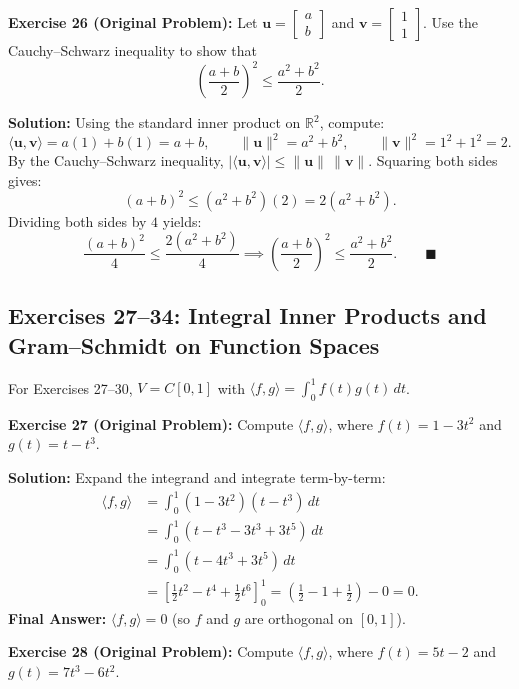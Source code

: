 \documentclass[11pt, letterpaper]{article}
\theoremstyle{definition}
\theoremstyle{remark}
\begin{document}
\textbf{Exercise 26 (Original Problem):} Let $\mathbf{u} = \begin{bmatrix} a \\ b \end{bmatrix}$ and $\mathbf{v} = \begin{bmatrix} 1 \\ 1 \end{bmatrix}$. Use the Cauchy--Schwarz inequality to show that
\[
    \left(\frac{a+b}{2}\right)^2 \le \frac{a^2 + b^2}{2}.
\]

\textbf{Solution:}
Using the standard inner product on $\mathbb{R}^2$, compute:
\[
    \langle \mathbf{u}, \mathbf{v} \rangle = a(1) + b(1) = a + b, \qquad
    \|\mathbf{u}\|^2 = a^2 + b^2, \qquad
    \|\mathbf{v}\|^2 = 1^2 + 1^2 = 2.
\]
By the Cauchy--Schwarz inequality, $|\langle \mathbf{u}, \mathbf{v} \rangle| \le \|\mathbf{u}\|\,\|\mathbf{v}\|$. Squaring both sides gives:
\[
    (a + b)^2 \le (a^2 + b^2)(2) = 2(a^2 + b^2).
\]
Dividing both sides by $4$ yields:
\[
    \frac{(a + b)^2}{4} \le \frac{2(a^2 + b^2)}{4} \implies \left(\frac{a+b}{2}\right)^2 \le \frac{a^2 + b^2}{2}. \qquad \blacksquare
\]

\subsection{Exercises 27--34: Integral Inner Products and Gram--Schmidt on Function Spaces}

For Exercises 27--30, $V = C[0, 1]$ with $\langle f, g \rangle = \int_0^1 f(t)g(t)\,dt$.

\textbf{Exercise 27 (Original Problem):} Compute $\langle f, g \rangle$, where $f(t) = 1 - 3t^2$ and $g(t) = t - t^3$.

\textbf{Solution:}
Expand the integrand and integrate term-by-term:
\begin{align*}
    \langle f, g \rangle &= \int_0^1 (1 - 3t^2)(t - t^3)\,dt \\
    &= \int_0^1 (t - t^3 - 3t^3 + 3t^5)\,dt \\
    &= \int_0^1 (t - 4t^3 + 3t^5)\,dt \\
    &= \left[ \frac{1}{2}t^2 - t^4 + \frac{1}{2}t^6 \right]_0^1 = \left(\frac{1}{2} - 1 + \frac{1}{2}\right) - 0 = 0.
\end{align*}
\textbf{Final Answer:} $\langle f, g \rangle = 0$ (so $f$ and $g$ are orthogonal on $[0, 1]$).

\textbf{Exercise 28 (Original Problem):} Compute $\langle f, g \rangle$, where $f(t) = 5t - 2$ and $g(t) = 7t^3 - 6t^2$.
\end{document}
